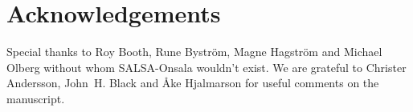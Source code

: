 \chapter*{Acknowledgements}

Special thanks to Roy Booth, Rune Bystr\"om, 
Magne Hagstr\"om and Michael Olberg without whom SALSA-Onsala
wouldn't exist. 
We are grateful to Christer Andersson, John~H. Black and \AA ke Hjalmarson for 
useful comments on the manuscript. 

